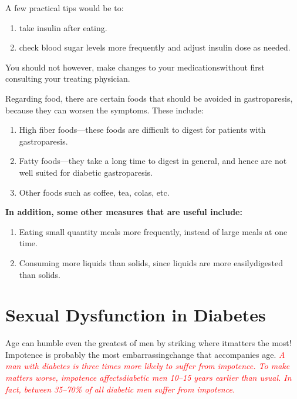 \noindent A few practical tips would be to:

\vspace{-\topsep}
\begin{enumerate}[•]
\itemsep=0pt
\item take insulin after eating.
\item check blood sugar levels more frequently and adjust insulin dose as needed.
\end{enumerate}
\vspace{-\topsep}

You should not however, make changes to your medications\break without first consulting your treating physician.

Regarding food, there are certain foods that should be avoided in gastroparesis, because they can worsen the symptoms. These include:

\vspace{-\topsep}
\begin{enumerate}[•]
\itemsep=0pt
\item High fiber foods—these foods are difficult to digest for patients with gastroparesis.
\item Fatty foods—they take a long time to digest in general, and hence are not well suited for diabetic gastroparesis.
\item Other foods such as coffee, tea, colas, etc.
\end{enumerate}
\vspace{-\topsep}

\noindent\textbf{In addition, some other measures that are useful include:}

\vspace{-\topsep}
\begin{enumerate}[•]
\itemsep=0pt
\item Eating small quantity meals more frequently, instead of large meals at one time.
\item Consuming more liquids than solids, since liquids are more easily\break digested than solids.
\end{enumerate}
\vspace{-\topsep}


\chapter{Sexual Dysfunction in Diabetes}\label{chap21}


Age can humble even the greatest of men by striking where it\break matters the most! Impotence is probably the most embarrassing\break change that accompanies age. \textcolor{red}{\textit{A man with diabetes is three times more likely to suffer from impotence. To make matters worse, impotence affects\break diabetic men 10–15 years earlier than usual. In fact, between 35–70\% of all diabetic men suffer from impotence.}}

